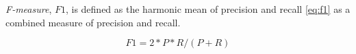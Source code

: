 \textit{F-measure}, $\mathit{F1}$, is defined as the harmonic mean of precision and recall \eqref{eq:f1} as a combined measure of precision and recall.

\begin{equation} \label{eq:f1}
    \mathit{F1} = 2 * P * R / (P + R)
\end{equation}




